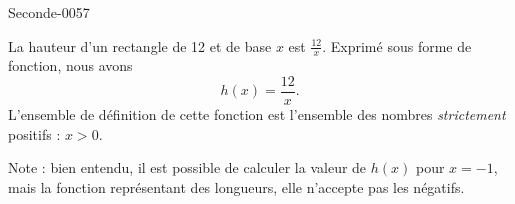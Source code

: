 
\begin{corrige}{Seconde-0057}

    La hauteur d'un rectangle de \unit{12}{\centi\meter\squared} et de base \( x\) est \( \frac{ 12 }{ x }\)\unit{}{\centi\meter}. Exprimé sous forme de fonction, nous avons
    \begin{equation}
        h(x)=\frac{ 12 }{ x }.
    \end{equation}
    L'ensemble de définition de cette fonction est l'ensemble des nombres \emph{strictement} positifs : \( x>0\).

    Note : bien entendu, il est possible de calculer la valeur de \( h(x)\) pour \( x=-1\), mais la fonction représentant des longueurs, elle n'accepte pas les négatifs.

\end{corrige}
